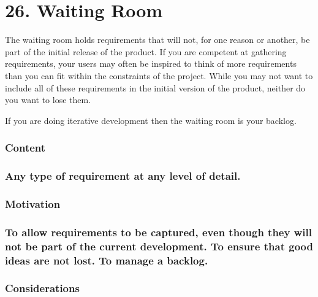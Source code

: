 \documentclass[
]{article}
\begin{document}
\hypertarget{waiting-room}{%
\section{26. Waiting Room}\label{waiting-room}}

The waiting room holds requirements that will not, for one reason or
another, be part of the initial release of the product. If you are
competent at gathering requirements, your users may often be inspired to
think of more requirements than you can fit within the constraints of
the project. While you may not want to include all of these requirements
in the initial version of the product, neither do you want to lose them.

If you are doing iterative development then the waiting room is your
backlog.

\hypertarget{content-76}{%
\subsubsection{Content}\label{content-76}}

\hypertarget{any-type-of-requirement-at-any-level-of-detail.}{%
\subsubsection{\texorpdfstring{Any type of requirement at any level of
detail.
}{Any type of requirement at any level of detail. }}\label{any-type-of-requirement-at-any-level-of-detail.}}

\hypertarget{motivation-75}{%
\subsubsection{Motivation}\label{motivation-75}}

\hypertarget{to-allow-requirements-to-be-captured-even-though-they-will-not-be-part-of-the-current-development.-to-ensure-that-good-ideas-are-not-lost.-to-manage-a-backlog.}{%
\subsubsection{To allow requirements to be captured, even though they
will not be part of the current development. To ensure that good ideas
are not lost. To manage a
backlog.}\label{to-allow-requirements-to-be-captured-even-though-they-will-not-be-part-of-the-current-development.-to-ensure-that-good-ideas-are-not-lost.-to-manage-a-backlog.}}

\hypertarget{considerations-57}{%
\subsubsection{Considerations}\label{considerations-57}}
\end{document}
